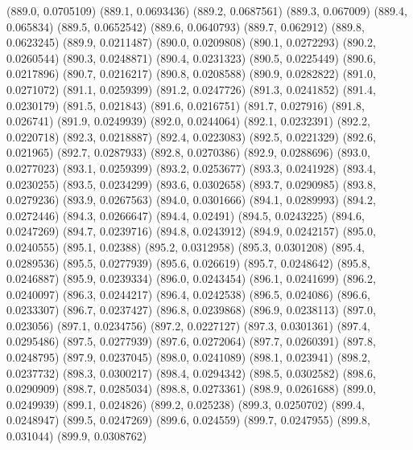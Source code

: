 {					(889.0, 0.0705109)
					(889.1, 0.0693436)
					(889.2, 0.0687561)
					(889.3, 0.067009)
					(889.4, 0.065834)
					(889.5, 0.0652542)
					(889.6, 0.0640793)
					(889.7, 0.062912)
					(889.8, 0.0623245)
					(889.9, 0.0211487)
					(890.0, 0.0209808)
					(890.1, 0.0272293)
					(890.2, 0.0260544)
					(890.3, 0.0248871)
					(890.4, 0.0231323)
					(890.5, 0.0225449)
					(890.6, 0.0217896)
					(890.7, 0.0216217)
					(890.8, 0.0208588)
					(890.9, 0.0282822)
					(891.0, 0.0271072)
					(891.1, 0.0259399)
					(891.2, 0.0247726)
					(891.3, 0.0241852)
					(891.4, 0.0230179)
					(891.5, 0.021843)
					(891.6, 0.0216751)
					(891.7, 0.027916)
					(891.8, 0.026741)
					(891.9, 0.0249939)
					(892.0, 0.0244064)
					(892.1, 0.0232391)
					(892.2, 0.0220718)
					(892.3, 0.0218887)
					(892.4, 0.0223083)
					(892.5, 0.0221329)
					(892.6, 0.021965)
					(892.7, 0.0287933)
					(892.8, 0.0270386)
					(892.9, 0.0288696)
					(893.0, 0.0277023)
					(893.1, 0.0259399)
					(893.2, 0.0253677)
					(893.3, 0.0241928)
					(893.4, 0.0230255)
					(893.5, 0.0234299)
					(893.6, 0.0302658)
					(893.7, 0.0290985)
					(893.8, 0.0279236)
					(893.9, 0.0267563)
					(894.0, 0.0301666)
					(894.1, 0.0289993)
					(894.2, 0.0272446)
					(894.3, 0.0266647)
					(894.4, 0.02491)
					(894.5, 0.0243225)
					(894.6, 0.0247269)
					(894.7, 0.0239716)
					(894.8, 0.0243912)
					(894.9, 0.0242157)
					(895.0, 0.0240555)
					(895.1, 0.02388)
					(895.2, 0.0312958)
					(895.3, 0.0301208)
					(895.4, 0.0289536)
					(895.5, 0.0277939)
					(895.6, 0.026619)
					(895.7, 0.0248642)
					(895.8, 0.0246887)
					(895.9, 0.0239334)
					(896.0, 0.0243454)
					(896.1, 0.0241699)
					(896.2, 0.0240097)
					(896.3, 0.0244217)
					(896.4, 0.0242538)
					(896.5, 0.024086)
					(896.6, 0.0233307)
					(896.7, 0.0237427)
					(896.8, 0.0239868)
					(896.9, 0.0238113)
					(897.0, 0.023056)
					(897.1, 0.0234756)
					(897.2, 0.0227127)
					(897.3, 0.0301361)
					(897.4, 0.0295486)
					(897.5, 0.0277939)
					(897.6, 0.0272064)
					(897.7, 0.0260391)
					(897.8, 0.0248795)
					(897.9, 0.0237045)
					(898.0, 0.0241089)
					(898.1, 0.023941)
					(898.2, 0.0237732)
					(898.3, 0.0300217)
					(898.4, 0.0294342)
					(898.5, 0.0302582)
					(898.6, 0.0290909)
					(898.7, 0.0285034)
					(898.8, 0.0273361)
					(898.9, 0.0261688)
					(899.0, 0.0249939)
					(899.1, 0.024826)
					(899.2, 0.025238)
					(899.3, 0.0250702)
					(899.4, 0.0248947)
					(899.5, 0.0247269)
					(899.6, 0.024559)
					(899.7, 0.0247955)
					(899.8, 0.031044)
					(899.9, 0.0308762)
}
